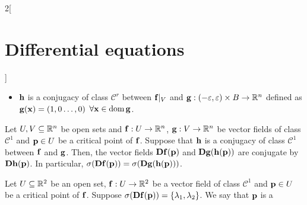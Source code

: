 \documentclass[../../../main.tex]{subfiles}
\begin{document}
\begin{multicols}{2}[\section{Differential equations}]
\begin{theorem}
\begin{itemize}
      \item $\boldsymbol{\mathrm{h}}$ is a conjugacy of class $\mathcal{C}^r$ between $\boldsymbol{\mathrm{f}}|_V$ and $\boldsymbol{\mathrm{g}}:(-\varepsilon,\varepsilon)\times B\rightarrow\mathbb{R}^n$ defined as $\boldsymbol{\mathrm{g}}(\boldsymbol{\mathrm{x}})=(1,0\ldots,0)$ $\forall \boldsymbol{\mathrm{x}}\in\operatorname{dom}\boldsymbol{\mathrm{g}}$.
    \end{itemize}
  \end{theorem}
  \begin{lemma}
    Let $U,V\subseteq \mathbb{R}^n$ be open sets and $\boldsymbol{\mathrm{f}}:U\rightarrow\mathbb{R}^n$, $\boldsymbol{\mathrm{g}}:V\rightarrow\mathbb{R}^n$ be vector fields of class $\mathcal{C}^1$ and $\boldsymbol{\mathrm{p}}\in U$ be a critical point of $\boldsymbol{\mathrm{f}}$. Suppose that $\boldsymbol{\mathrm{h}}$ is a conjugacy of class $\mathcal{C}^1$ between $\boldsymbol{\mathrm{f}}$ and $\boldsymbol{\mathrm{g}}$. Then, the vector fields $\boldsymbol{\mathrm{Df}}(\boldsymbol{\mathrm{p}})$ and $\boldsymbol{\mathrm{Dg}}(\boldsymbol{\mathrm{h}}(\boldsymbol{\mathrm{p}}))$ are conjugate by $\boldsymbol{\mathrm{Dh}}(\boldsymbol{\mathrm{p}})$. In particular, $\sigma(\boldsymbol{\mathrm{Df}}(\boldsymbol{\mathrm{p}}))=\sigma(\boldsymbol{\mathrm{Dg}}(\boldsymbol{\mathrm{h}}(\boldsymbol{\mathrm{p}})))$.
  \end{lemma}
  \begin{definition}
    Let $U\subseteq \mathbb{R}^2$ be an open set, $\boldsymbol{\mathrm{f}}:U\rightarrow\mathbb{R}^2$ be a vector field of class $\mathcal{C}^1$ and $\boldsymbol{\mathrm{p}}\in U$ be a critical point of $\boldsymbol{\mathrm{f}}$. Suppose $\sigma(\boldsymbol{\mathrm{Df}}(\boldsymbol{\mathrm{p}}))=\{\lambda_1,\lambda_2\}$. We say that $\boldsymbol{\mathrm{p}}$ is a
\end{definition}
\end{multicols}
\end{document}
